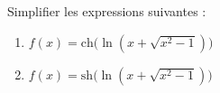 
\begin{exercice}\label{exostarterST-0013}


Simplifier les expressions suivantes :
\begin{enumerate}
\item $f(x)=\text{ch}\Big(\ln(x+\sqrt{x^2-1})\Big)$
\item $f(x)=\text{sh}\Big(\ln(x+\sqrt{x^2-1})\Big)$
\end{enumerate}


\end{exercice}
